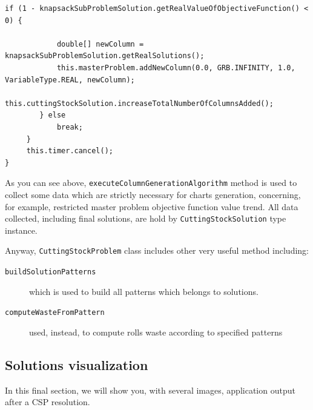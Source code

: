 \documentclass[10pt,a4paper]{article}
\begin{document}
\begin{itemize}
\begin{adjustwidth}{-2cm}{-2cm}
\begin{lstlisting}[frame=lines, caption={\texttt{executeColumnGenerationAlgorithm()} method implementation.}, label={code:cga}]
        if (1 - knapsackSubProblemSolution.getRealValueOfObjectiveFunction() < 0) {

            double[] newColumn = knapsackSubProblemSolution.getRealSolutions();
            this.masterProblem.addNewColumn(0.0, GRB.INFINITY, 1.0, VariableType.REAL, newColumn);
            this.cuttingStockSolution.increaseTotalNumberOfColumnsAdded();
        } else
            break;
     }
     this.timer.cancel();
}
\end{lstlisting}
\end{adjustwidth} 

\end{itemize}

As you can see above, \texttt{executeColumnGenerationAlgorithm} method is used to collect some data which are strictly necessary for charts generation, concerning, for example, restricted master problem objective function value trend. All data collected, including final solutions, are hold by \texttt{CuttingStockSolution} type instance.

Anyway, \texttt{CuttingStockProblem} class includes other very useful method including:

\begin{description}
\item[\texttt{buildSolutionPatterns}] which is used to build all patterns which belongs to solutions.

\item[\texttt{computeWasteFromPattern}] used, instead, to compute rolls waste according to specified patterns
\end{description}

\newpage
\subsection{Solutions visualization}

In this final section, we will show you, with several images, application output after a CSP resolution.
\end{document}

